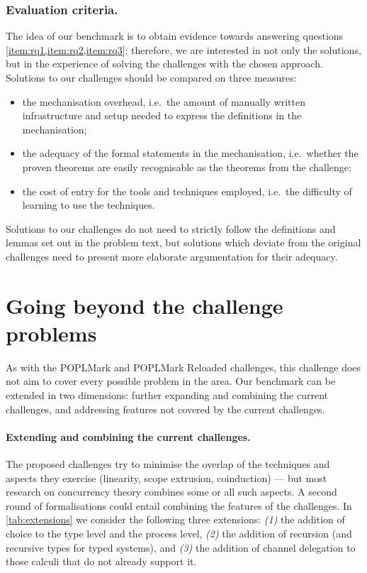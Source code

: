 \documentclass[runningheads]{llncs}
\begin{document}
\subsubsection{Evaluation criteria.}
The idea of our benchmark is to obtain evidence towards answering questions \cref{item:rq1,item:rq2,item:rq3}: therefore, we are interested in not only the solutions, but in the experience of solving the challenges with the chosen approach.
Solutions to our challenges should be compared on three measures:
\begin{itemize}
\item the mechanisation overhead, i.e.~the amount of manually written infrastructure and setup needed to express the definitions in the mechanisation; \item the adequacy of the formal statements in the mechanisation, i.e.~whether the proven theorems are easily recognisable as the theorems from the challenge; \item the cost of entry for the tools and techniques employed, i.e.~the difficulty of learning to use the techniques.
\end{itemize}
Solutions to our challenges do not need to strictly follow the definitions and lemmas set out in the problem text, but solutions which deviate from the original challenges need to present more elaborate argumentation for their adequacy.

\section{Going beyond the challenge problems}\label{sec:going-beyond}

As with the POPLMark and POPLMark Reloaded challenges, this challenge does not aim to cover every possible
problem in the area. Our benchmark can be extended in two
dimensions: further expanding and combining the current challenges,
and addressing features not covered by the current challenges.

\vspace{-1mm}%
\paragraph{Extending and combining the current challenges.}
The proposed challenges try to minimise the overlap of the techniques
and aspects they exercise (linearity, scope extrusion, coinduction) --- but most
research on concurrency theory combines some or all such aspects. A second round of formalisations could
entail combining the features of the challenges.
In \cref{tab:extensions} we consider the following three extensions:
\emph{(1)} the addition of choice to the type level and the process level,
\emph{(2)} the addition of recursion (and recursive types for typed systems),
and \emph{(3)} the
addition of channel delegation to those calculi that do not already
support it.
\end{document}
